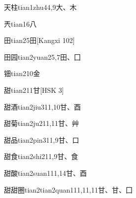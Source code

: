 \begin{entry}{天柱}{tian1zhu4}{4,9}{⼤、⽊}
\end{entry}

\begin{entry}{兲}{tian1}{6}{⼋}
\end{entry}

\begin{entry}{田}{tian2}{5}{⽥}[Kangxi 102]
\end{entry}

\begin{entry}{田园}{tian2yuan2}{5,7}{⽥、⼞}
\end{entry}

\begin{entry}{钿}{tian2}{10}{⾦}
\end{entry}

\begin{entry}{甜}{tian2}{11}{⽢}[HSK 3]
\end{entry}

\begin{entry}{甜酒}{tian2jiu3}{11,10}{⽢、⾣}
\end{entry}

\begin{entry}{甜菊}{tian2ju2}{11,11}{⽢、⾋}
\end{entry}

\begin{entry}{甜品}{tian2pin3}{11,9}{⽢、⼝}
\end{entry}

\begin{entry}{甜食}{tian2shi2}{11,9}{⽢、⾷}
\end{entry}

\begin{entry}{甜酸}{tian2suan1}{11,14}{⽢、⾣}
\end{entry}

\begin{entry}{甜甜圈}{tian2tian2quan1}{11,11,11}{⽢、⽢、⼞}
\end{entry}

